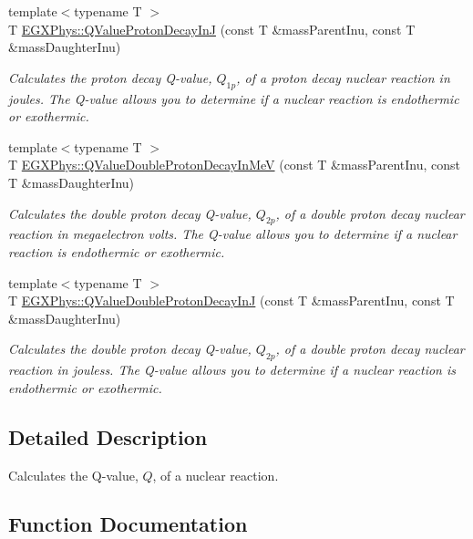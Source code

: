 \begin{DoxyCompactItemize}
{\footnotesize template$<$typename T $>$ }\\T \hyperlink{group___e_g_x_phys-_q_value_gaa344322393356bd442d17c992628218a}{E\+G\+X\+Phys\+::\+Q\+Value\+Proton\+Decay\+InJ} (const T \&mass\+Parent\+Inu, const T \&mass\+Daughter\+Inu)
\begin{DoxyCompactList}\small\item\em Calculates the proton decay Q-\/value, $Q_{1p}$, of a proton decay nuclear reaction in joules. The Q-\/value allows you to determine if a nuclear reaction is endothermic or exothermic. \end{DoxyCompactList}\item 
{\footnotesize template$<$typename T $>$ }\\T \hyperlink{group___e_g_x_phys-_q_value_ga4a57c8901e92918f08bee52493b81c59}{E\+G\+X\+Phys\+::\+Q\+Value\+Double\+Proton\+Decay\+In\+MeV} (const T \&mass\+Parent\+Inu, const T \&mass\+Daughter\+Inu)
\begin{DoxyCompactList}\small\item\em Calculates the double proton decay Q-\/value, $Q_{2p}$, of a double proton decay nuclear reaction in megaelectron volts. The Q-\/value allows you to determine if a nuclear reaction is endothermic or exothermic. \end{DoxyCompactList}\item 
{\footnotesize template$<$typename T $>$ }\\T \hyperlink{group___e_g_x_phys-_q_value_ga64a3867f65de5586feab99527bb03d31}{E\+G\+X\+Phys\+::\+Q\+Value\+Double\+Proton\+Decay\+InJ} (const T \&mass\+Parent\+Inu, const T \&mass\+Daughter\+Inu)
\begin{DoxyCompactList}\small\item\em Calculates the double proton decay Q-\/value, $Q_{2p}$, of a double proton decay nuclear reaction in jouless. The Q-\/value allows you to determine if a nuclear reaction is endothermic or exothermic. \end{DoxyCompactList}\end{DoxyCompactItemize}


\subsection{Detailed Description}
Calculates the Q-\/value, $Q$, of a nuclear reaction. 

\subsection{Function Documentation}
\mbox{\label{group___e_g_x_phys-_q_value_ga3e767be294dae24e1df18e7ccb8989e6}} 
